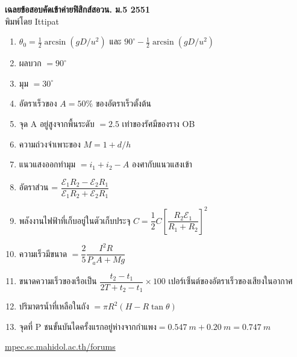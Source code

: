 \documentclass[a4paper,12pt]{article}
\begin{document}
\thispagestyle{empty}
\begin{center}
	{\huge \textbf{เฉลยข้อสอบคัดเข้าค่ายฟิสิกส์สอวน. ม.\textenglish{5} 2551}}\\
	พิมพ์โดย Ittipat\\
\end{center}
\begin{enumerate}
	\item \(\theta_{0}=\frac{1}{2}\arcsin(gD/u^2)\) และ \(90^{\circ}-\frac{1}{2}\arcsin(gD/u^2)\)
	\item ผลบวก \(= 90^{\circ}\)
	\item มุม \(= 30^{\circ}\)
	\item อัตราเร็วของ \(A = 50 \%\) ของอัตราเร็วตั้งต้น
	\item จุด A อยู่สูงจากพื้นระดับ \(= 2.5\) เท่าของรัศมีของราง OB
	\item ความถ่วงจำเพาะของ \(M = 1+d/h\)
	\item แนวแสงออกทำมุม \(= i_1+i_2-A\) องศากับแนวแสงเข้า
	\item อัตราส่วน = \(\dfrac{\mathcal{E}_1R_2-\mathcal{E}_2R_1}{\mathcal{E}_1R_2+\mathcal{E}_2R_1}\)
	\item พลังงานไฟฟ้าที่เก็บอยู่ในตัวเก็บประจุ \(C = \dfrac{1}{2}C\left [ \dfrac{R_2\mathcal{E}_1}{R_1+R_2} \right ]^2\)
	\item ความเร็วมีขนาด \(= \dfrac{2}{5}\dfrac{I^2R}{P_aA+Mg}\)
	\item ขนาดความเร็วของเรือเป็น \(\dfrac{t_2-t_1}{2T+t_2-t_1}\times 100\) เปอร์เซ็นต์ของอัตราเร็วของเสียงในอากาศ
	\item ปริมาตรน้ำที่เหลือในถัง \(= \pi R^2 (H-R\tan \theta)\)
	\item จุดที่ P ชนขั้นบันไดครั้งแรกอยู่ห่างจากกำแพง\( = \SI{0.547}{m} + \SI{0.20}{m}= \SI{0.747}{m}\)
\end{enumerate}
\vfill	
\begin{center}
	\href{http://mpec.sc.mahidol.ac.th/forums/}{mpec.sc.mahidol.ac.th/forums}
\end{center}
\end{document}
